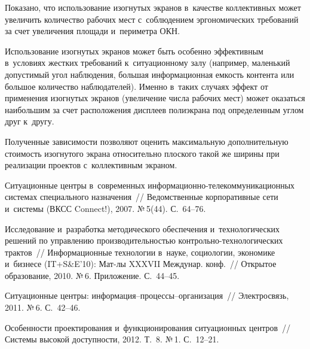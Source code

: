 \begin{multicols}{2}
     Показано, что использование изогнутых экранов в~качестве
коллективных может увеличить количество рабочих мест с~соблюдением
эргономических требований за счет увеличения площади и~пери\-мет\-ра ОКН.

     Использование изогнутых экранов может быть особенно эффективным
в~условиях жестких требований к~ситуационному залу (например, маленький
допустимый угол наблюдения, большая информационная емкость контента или
большое количество наблюдателей). Именно в~таких случаях эффект от
применения изогнутых экранов (увеличение числа рабочих мест) может
оказаться наибольшим за счет расположения дисплеев полиэкрана под
определенным углом друг к~другу.

     Полученные зависимости позволяют оценить максимальную
дополнительную стоимость изогнутого экрана относительно плоского такой же
ширины при реализации проектов с~коллективным экраном.

\vspace*{-6pt}

{\small\frenchspacing
 {%
 \begin{thebibliography}{99}
 Ситуационные центры в~современных
ин\-фор\-ма\-ци\-он\-но-те\-леком\-му\-ни\-ка\-ци\-он\-ных сис\-те\-мах специального
назначения~// Ведомственные корпоративные сети и~систе\-мы (ВКСС Connect!), 2007.
№\,5(44). С.~64--76.

 Исследование и~разработка методического
обеспечения и~технологических решений по управлению производительностью
конт\-роль\-но-тех\-но\-ло\-ги\-че\-ских трактов~// Информационные технологии в~науке,
социологии, экономике и~бизнесе (IT\;+\;S\&E'10): Мат-лы XXXVII Междунар. конф.~//
Открытое образование, 2010. №\,6. Приложение. С.~44--45.

 Ситуационные центры:
ин\-фор\-ма\-ция--про\-цес\-сы--ор\-га\-ни\-за\-ция~// Электросвязь, 2011. №\,6. С.~42--46.

 Особенности проектирования
и~функционирования ситуационных цент\-ров~// Системы высокой доступности, 2012.
Т.~8. №\,1. С.~12--21.




\end{thebibliography}}}
\end{multicols}
